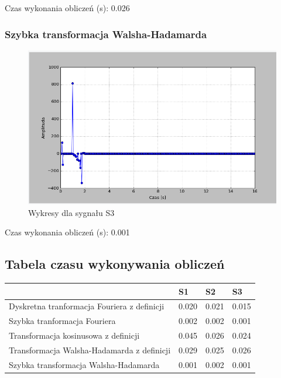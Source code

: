 \documentclass{article}
\begin{document}
{                Czas wykonania obliczeń (s): 0.026 
            
            \subsubsection{Szybka transformacja Walsha-Hadamarda}

            
                \begin{figure}[h!]
                    \centering
                    \includegraphics[width=1\textwidth]{img/fwalshs3.png}
                    \caption{Wykresy dla sygnału S3}
                \end{figure}
                \FloatBarrier

                Czas wykonania obliczeń (s): 0.001 
    \subsection{Tabela czasu wykonywania obliczeń}
        \begin{table}[h!]
            \begin{tabular}{|l|l|l|l|}
                \hline
                                                                            & S1        & S2     & S3        \\ \hline
                Dyskretna tranformacja Fouriera z definicji                 & 0.020     & 0.021  & 0.015     \\ \hline
                Szybka tranformacja Fouriera                                & 0.002     & 0.002  & 0.001     \\ \hline
                Transformacja kosinusowa z definicji                        & 0.045     & 0.026  & 0.024     \\ \hline
                Transformacja Walsha-Hadamarda z definicji                  & 0.029     & 0.025  & 0.026     \\ \hline
                Szybka transformacja Walsha-Hadamarda                       & 0.001     & 0.002  & 0.001     \\ \hline
            \end{tabular}
        \end{table}
    }
\end{document}
